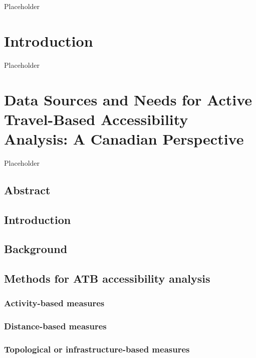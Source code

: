 \documentclass[
11pt, %
oneside, %
english, %
singlespacing, %
]{macthesis} %
\begin{document}
Placeholder

\hypertarget{introduction}{%
\chapter{Introduction}\label{introduction}}

Placeholder

\hypertarget{rmd-basics}{%
\chapter{Data Sources and Needs for Active Travel-Based Accessibility Analysis: A Canadian Perspective}\label{rmd-basics}}

Placeholder

\hypertarget{abstract}{%
\section{Abstract}\label{abstract}}

\hypertarget{introduction-1}{%
\section{Introduction}\label{introduction-1}}

\hypertarget{background}{%
\section{Background}\label{background}}

\hypertarget{methods-for-atb-accessibility-analysis}{%
\section{Methods for ATB accessibility analysis}\label{methods-for-atb-accessibility-analysis}}

\hypertarget{activity-based-measures}{%
\subsection{Activity-based measures}\label{activity-based-measures}}

\hypertarget{distance-based-measures}{%
\subsection{Distance-based measures}\label{distance-based-measures}}

\hypertarget{topological-or-infrastructure-based-measures}{%
\subsection{Topological or infrastructure-based measures}\label{topological-or-infrastructure-based-measures}}
\end{document}
